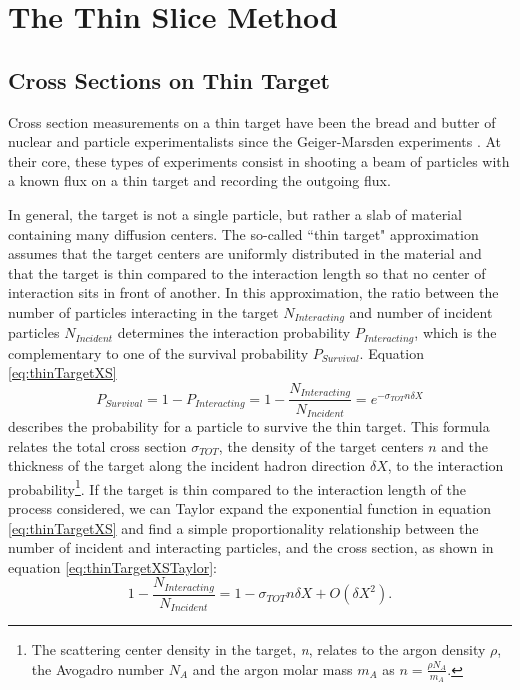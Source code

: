 \section{The Thin Slice Method}\label{ch:ThinSliceMethod}
\subsection{Cross Sections on Thin Target}
Cross section measurements on a thin target have been the bread and butter of nuclear and particle experimentalists since the Geiger-Marsden experiments \cite{Geiger1909}. At their core, these types of experiments consist in shooting a beam of particles with a known flux on a thin target and recording the outgoing flux. 


In general, the target is not a single particle, but rather a slab of material containing many diffusion centers. The so-called  ``thin target" approximation assumes that the target centers are uniformly distributed in the material and that the target is thin compared to the interaction length so that no center of interaction sits in front of another. In this approximation, the ratio between the number of particles interacting in the target $N_{Interacting}$ and number of incident particles $N_{Incident}$ determines the interaction probability $P_{Interacting}$, which is the complementary to one of the survival probability $P_{Survival}$. 
Equation \ref{eq:thinTargetXS} 
\begin{equation}
P_{Survival} = 1- P_{Interacting} = 1 - \frac{N_{Interacting}}{N_{Incident}} = e^{-\sigma_{TOT} n \delta X}
\label{eq:thinTargetXS}
\end{equation}
describes the probability for a particle to survive the thin target. This formula relates the total cross section $\sigma_{TOT}$, the density of the target centers  $n$  and  the thickness of the target  along the incident hadron direction $\delta X$, to the interaction probability\footnote{The scattering center density in the target, {\emph{n}},  relates to the argon density $\rho$, the Avogadro number  $ N_{A} $ and the argon molar mass $m_A$ as $n=\frac{\rho N_{A} }{m_A}$.}. If the target is thin compared to the interaction length of the process considered, we can Taylor expand the exponential function in equation \ref{eq:thinTargetXS} and find a simple proportionality relationship between the number of incident and interacting particles, and the cross section, as shown in equation \ref{eq:thinTargetXSTaylor}:
\begin{equation}
1 - \frac{N_{Interacting}}{N_{Incident}} =  1 -\sigma_{TOT} n \delta X + O(\delta X^2).
\label{eq:thinTargetXSTaylor}
\end{equation}

